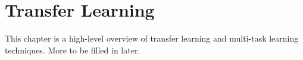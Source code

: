 \chapter{Transfer Learning}
This chapter is a high-level overview of transfer learning and multi-task learning techniques. More to be filled in later.